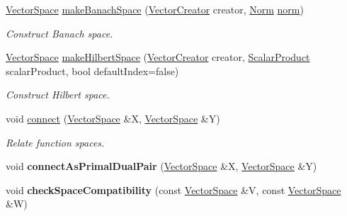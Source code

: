 \begin{DoxyCompactItemize}
\item 
\hyperlink{classSpacy_1_1VectorSpace}{Vector\+Space} \hyperlink{namespaceSpacy_abfc17f845736365ee79be8ce68d50b27}{make\+Banach\+Space} (\hyperlink{namespaceSpacy_a94fc7a4b9d3b26ef835e61647fac4d9b}{Vector\+Creator} creator, \hyperlink{namespaceSpacy_a0dbe77a4e1282ef88017e94d50d17791}{Norm} \hyperlink{namespaceSpacy_a86a4fc266aa19a07b0af16388907354b}{norm})
\begin{DoxyCompactList}\small\item\em Construct Banach space. \end{DoxyCompactList}\item 
\hyperlink{classSpacy_1_1VectorSpace}{Vector\+Space} \hyperlink{namespaceSpacy_a63c49d211bf214be1fb321440ed03aad}{make\+Hilbert\+Space} (\hyperlink{namespaceSpacy_a94fc7a4b9d3b26ef835e61647fac4d9b}{Vector\+Creator} creator, \hyperlink{namespaceSpacy_aa995526aa0e3fa58aca8dd6772311cad}{Scalar\+Product} scalar\+Product, bool default\+Index=false)
\begin{DoxyCompactList}\small\item\em Construct Hilbert space. \end{DoxyCompactList}\item 
void \hyperlink{namespaceSpacy_ad115dc8703f23d8070c7da07a59ca067}{connect} (\hyperlink{classSpacy_1_1VectorSpace}{Vector\+Space} \&X, \hyperlink{classSpacy_1_1VectorSpace}{Vector\+Space} \&Y)
\begin{DoxyCompactList}\small\item\em Relate function spaces. \end{DoxyCompactList}\item 
\hypertarget{namespaceSpacy_a72844d3d381380c382cd9dce912e2664}{}void {\bfseries connect\+As\+Primal\+Dual\+Pair} (\hyperlink{classSpacy_1_1VectorSpace}{Vector\+Space} \&X, \hyperlink{classSpacy_1_1VectorSpace}{Vector\+Space} \&Y)\label{namespaceSpacy_a72844d3d381380c382cd9dce912e2664}

\item 
\hypertarget{namespaceSpacy_aae18423491adef608743902f1c40844e}{}void {\bfseries check\+Space\+Compatibility} (const \hyperlink{classSpacy_1_1VectorSpace}{Vector\+Space} \&V, const \hyperlink{classSpacy_1_1VectorSpace}{Vector\+Space} \&W)\label{namespaceSpacy_aae18423491adef608743902f1c40844e}

\end{DoxyCompactItemize}
